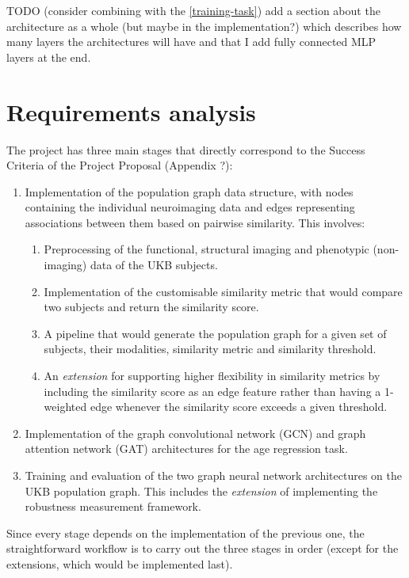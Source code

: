TODO (consider combining with the \ref{training-task}) add a section about the architecture as a whole (but maybe in the implementation?) which describes how many layers the architectures will have and that I add fully connected MLP layers at the end.

\section{Requirements analysis}

The project has three main stages that directly correspond to the Success Criteria of the Project Proposal (Appendix ?):

\begin{enumerate}
    \item Implementation of the population graph data structure, with nodes containing the individual neuroimaging data and edges representing associations between them based on pairwise similarity. This involves: \begin{enumerate}
        \item Preprocessing of the functional, structural imaging and phenotypic (non-imaging) data of the UKB subjects.
        \item Implementation of the customisable similarity metric that would compare two subjects and return the similarity score.
        \item A pipeline that would generate the population graph for a given set of subjects, their modalities, similarity metric and similarity threshold.
        \item An \textit{extension} for supporting higher flexibility in similarity metrics by including the similarity score as an edge feature rather than having a 1-weighted edge whenever the similarity score exceeds a given threshold.
    \end{enumerate}
    \item Implementation of the graph convolutional network (GCN) and graph attention network (GAT) architectures for the age regression task. 
    \item Training and evaluation of the two graph neural network architectures on the UKB population graph. This includes the \textit{extension} of implementing the robustness measurement framework.
\end{enumerate}

Since every stage depends on the implementation of the previous one, the straightforward workflow is to carry out the three stages in order (except for the extensions, which would be implemented last). 

